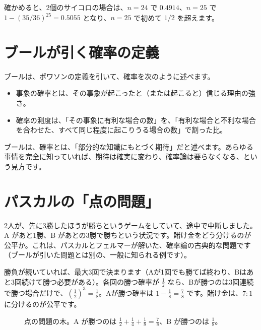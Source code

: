 \documentclass[a4paper,11pt,openany]{ltjsbook}
\begin{document}
確かめると、2個のサイコロの場合は、$n=24$ で $0.4914$、$n=25$ で $1-(35/36)^{25}=0.5055$ となり、$n=25$ で初めて $1/2$ を超えます。

\section{ブールが引く確率の定義}

ブールは、ポワソンの定義を引いて、確率を次のように述べます。

\begin{itemize}[leftmargin=*]
\item 事象の確率とは、その事象が起こったと（または起こると）信じる理由の強さ。
\item 確率の測度は、「その事象に有利な場合の数」を、「有利な場合と不利な場合を合わせた、すべて同じ程度に起こりうる場合の数」で割った比。
\end{itemize}

ブールは、確率とは、「部分的な知識にもとづく期待」だと述べます。あらゆる事情を完全に知っていれば、期待は確実に変わり、確率論は要らなくなる、という見方です。

\section{パスカルの「点の問題」}

2人が、先に3勝したほうが勝ちというゲームをしていて、途中で中断しました。A があと1勝、B があとの3勝で勝ちという状況です。賭け金をどう分けるのが公平か。これは、パスカルとフェルマーが解いた、確率論の古典的な問題です（ブールが引いた問題とは別の、一般に知られる例です）。

勝負が続いていれば、最大3回で決まります（Aが1回でも勝てば終わり、Bはあと3回続けて勝つ必要がある）。各回の勝つ確率が $\tfrac12$ なら、Bが勝つのは3回連続で勝つ場合だけで、$(\tfrac12)^3=\tfrac18$。Aが勝つ確率は $1-\tfrac18=\tfrac78$ です。賭け金は、$7:1$ に分けるのが公平です。

\begin{figure}[htbp]
\centering
{}
\caption{点の問題の木。A が勝つのは $\tfrac12+\tfrac14+\tfrac18=\tfrac78$、B が勝つのは $\tfrac18$。}
\end{figure}
\end{document}
